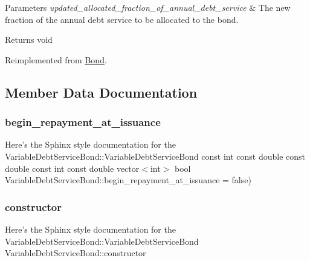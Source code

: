 \begin{DoxyParams}{Parameters}
{\em updated\+\_\+allocated\+\_\+fraction\+\_\+of\+\_\+annual\+\_\+debt\+\_\+service} & The new fraction of the annual debt service to be allocated to the bond.\\
\hline
\end{DoxyParams}
\begin{DoxyReturn}{Returns}
void 
\end{DoxyReturn}


Reimplemented from \mbox{\hyperlink{classBond_aff7fc4e1edcf199fb592d22c765b854e}{Bond}}.



\subsection{Member Data Documentation}
\mbox{\label{classVariableDebtServiceBond_a24b333de66efd610ef5d94a673250ff9}} 
\subsubsection{\texorpdfstring{begin\+\_\+repayment\+\_\+at\+\_\+issuance}{begin\_repayment\_at\_issuance}}
{\footnotesize\ttfamily Here’s the Sphinx style documentation for the Variable\+Debt\+Service\+Bond\+::\+Variable\+Debt\+Service\+Bond const int const double const double const int const double vector$<$int$>$ bool Variable\+Debt\+Service\+Bond\+::begin\+\_\+repayment\+\_\+at\+\_\+issuance = false)}

\mbox{\label{classVariableDebtServiceBond_a9369eb5b081c45a8608630b3eacae979}} 
\subsubsection{\texorpdfstring{constructor}{constructor}}
{\footnotesize\ttfamily Here’s the Sphinx style documentation for the Variable\+Debt\+Service\+Bond\+::\+Variable\+Debt\+Service\+Bond Variable\+Debt\+Service\+Bond\+::constructor}

